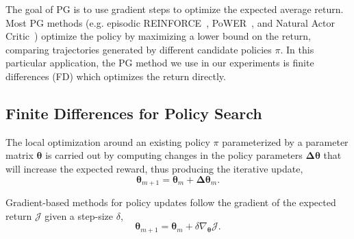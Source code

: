 \documentclass{aamas2016}
\begin{document}
The goal of PG is to use gradient steps to optimize the expected average return. 
Most PG methods (e.g. episodic REINFORCE~\cite{williams1992simple}, PoWER~\cite{kober2009policy}, and Natural Actor 
Critic~\cite{peters2008natural}) optimize the policy by maximizing a lower bound on the return, 
comparing trajectories generated by different candidate policies $\pi$. 
In this particular application, the PG method we use in our experiments is finite differences (FD) \cite{Bagnell-2013} 
which optimizes the return directly.

\subsection{Finite Differences for Policy Search}
The local optimization around an existing policy $\pi$ parameterized by a parameter matrix $\boldsymbol{\theta}$ 
is carried out by computing changes in the policy parameters $\boldsymbol{\Delta \theta}$ that will increase the expected reward, thus
producing the iterative update,
\begin{displaymath}
 \boldsymbol{\theta}_{m+1} = \boldsymbol{\theta}_{m}+\boldsymbol{\Delta \theta}_{m}.
\end{displaymath}


Gradient-based methods for policy updates follow the gradient of the expected return $\mathcal{J}$ %
given a step-size $\delta$,
\begin{displaymath}
 \boldsymbol{\theta}_{m+1} = \boldsymbol{\theta}_{m}+\delta\nabla_{\boldsymbol{\theta}}\mathcal{J}.
\end{displaymath}
\end{document}
